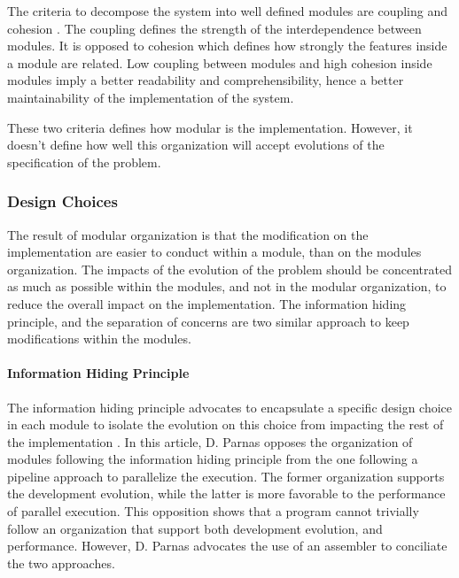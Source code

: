 The criteria to decompose the system into well defined modules are coupling and cohesion \cite{Stevens1974}.
The coupling defines the strength of the interdependence between modules.
It is opposed to cohesion which defines how strongly the features inside a module are related.
Low coupling between modules and high cohesion inside modules imply a better readability and comprehensibility, hence a better maintainability of the implementation of the system.

These two criteria defines how modular is the implementation.
However, it doesn't define how well this organization will accept evolutions of the specification of the problem.



\subsubsection{Design Choices}

The result of modular organization is that the modification on the implementation are easier to conduct within a module, than on the modules organization.
The impacts of the evolution of the problem should be concentrated as much as possible within the modules, and not in the modular organization, to reduce the overall impact on the implementation.
The information hiding principle, and the separation of concerns are two similar approach to keep modifications within the modules.

\paragraph{Information Hiding Principle}

The information hiding principle advocates to encapsulate a specific design choice in each module to isolate the evolution on this choice from impacting the rest of the implementation \cite{Parnas1972}.
In this article, D. Parnas opposes the organization of modules following the information hiding principle from the one following a pipeline approach to parallelize the execution.
The former organization supports the development evolution, while the latter is more favorable to the performance of parallel execution.
This opposition shows that a program cannot trivially follow an organization that support both development evolution, and performance.
However, D. Parnas advocates the use of an assembler to conciliate the two approaches.

